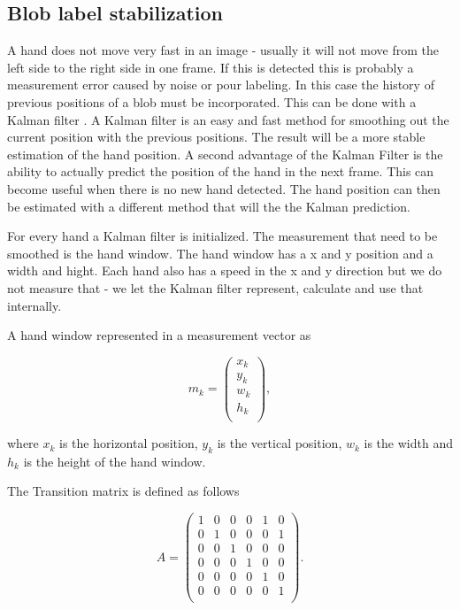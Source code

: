 \subsection*{Blob label stabilization}
A hand does not move very fast in an image - usually it will not move from the left side to the right side in one frame. If this is detected this is probably a measurement error caused by noise or pour labeling. In this case the history of previous positions of a blob must be incorporated. This can be done with a Kalman filter \cite{welch1995}. A Kalman filter is an easy and fast method for smoothing out the current position with the previous positions. The result will be a more stable estimation of the hand position. A second advantage of the Kalman Filter is the ability to actually predict the position of the hand in the next frame. This can become useful when there is no new hand detected. The hand position can then be estimated with a different method that will the the Kalman prediction.

For every hand a Kalman filter is initialized. The measurement that need to be smoothed is the hand window. The hand window has a x and y position and a width and hight. Each hand also has a speed in the x and y direction but we do not measure that - we let the Kalman filter represent, calculate and use that internally. 

A hand window represented in a measurement vector as

\begin{equation}
 m_k = \left(
\begin{array}{c}
	x_k \\ %
	y_k \\ %
	w_k \\ %
	h_k \\ %
\end{array} \right),
\end{equation}

where $x_k$ is the horizontal position, $y_k$ is the vertical position, $w_k$ is the width and $h_k$ is the height of the hand window.

The Transition matrix is defined as follows

\begin{equation}
 A = \left(
\begin{array}{cccccc}
	1 & 0 & 0 & 0 & 1 & 0 \\
	0 & 1 & 0 & 0 & 0 & 1 \\
	0 & 0 & 1 & 0 & 0 & 0 \\
	0 & 0 & 0 & 1 & 0 & 0 \\
	0 & 0 & 0 & 0 & 1 & 0 \\
	0 & 0 & 0 & 0 & 0 & 1 \\
\end{array} \right).
\end{equation}
	
